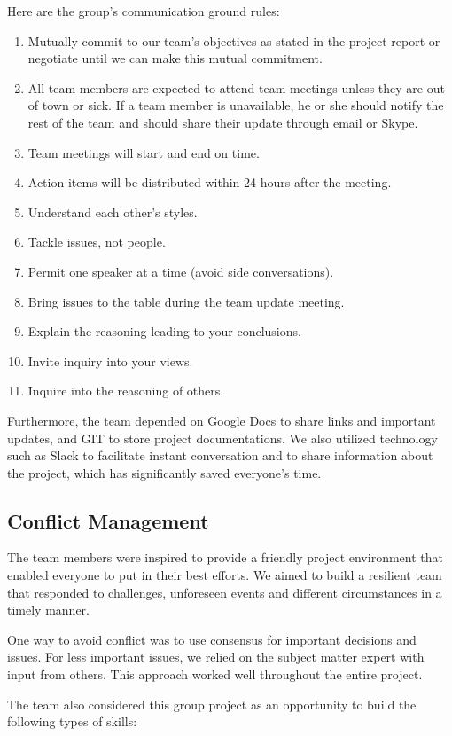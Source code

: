 \documentclass{article}
\begin{document}
Here are the group’s communication ground rules:
\begin{enumerate}
  \item Mutually commit to our team’s objectives as stated in the project report or negotiate until we can make this mutual commitment.
  \item All team members are expected to attend team meetings unless they are out of town or sick. If a team member is unavailable, he or she should notify the rest of the team and should share their update through email or Skype.
  \item Team meetings will start and end on time.
  \item Action items will be distributed within 24 hours after the meeting.
  \item Understand each other’s styles.
  \item Tackle issues, not people.
  \item Permit one speaker at a time (avoid side conversations).
  \item Bring issues to the table during the team update meeting.
  \item Explain the reasoning leading to your conclusions.
  \item Invite inquiry into your views.
  \item Inquire into the reasoning of others.
\end{enumerate}


Furthermore, the team depended on Google Docs to share links and important updates, and GIT to store project documentations. We also utilized technology such as Slack to facilitate instant conversation and to share information about the project, which has significantly saved everyone’s time.

\subsection{Conflict Management}
The team members were inspired to provide a friendly project environment that enabled everyone to put in their best efforts. We aimed to build a resilient team that responded to challenges, unforeseen events and different circumstances in a timely manner.

One way to avoid conflict was to use consensus for important decisions and issues. For less important issues, we relied on the subject matter expert with input from others. This approach worked well throughout the entire project.


\hfill \break %
The team also considered this group project as an opportunity to build the following types of skills:
\end{document}
